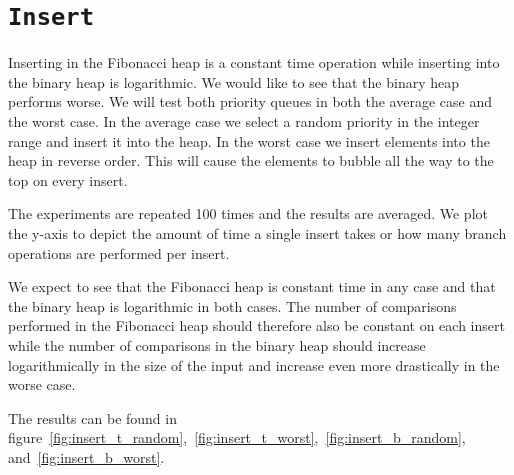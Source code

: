 \documentclass[a4paper,oneside,article,11pt]{memoir}
\begin{document}
\section{\texttt{Insert}}
Inserting in the Fibonacci heap is a constant time operation while inserting into the binary heap is logarithmic. We would like to see that the binary heap performs worse. We will test both priority queues in both the average case and the worst case. In the average case we select a random priority in the integer range and insert it into the heap.
In the worst case we insert elements into the heap in reverse order. This will cause the elements to bubble all the way to the top on every insert.

The experiments are repeated 100 times and the results are averaged. We plot the y-axis to depict the amount of time a single insert takes or how many branch operations are performed per insert.

We expect to see that the Fibonacci heap is constant time in any case and that the binary heap is logarithmic in both cases. The number of comparisons performed in the Fibonacci heap should therefore also be constant on each insert while the number of comparisons in the binary heap should increase logarithmically in the size of the input and increase even more drastically in the worse case.

The results can be found in figure~\ref{fig:insert_t_random},~\ref{fig:insert_t_worst},~\ref{fig:insert_b_random}, and~\ref{fig:insert_b_worst}.
\end{document}
